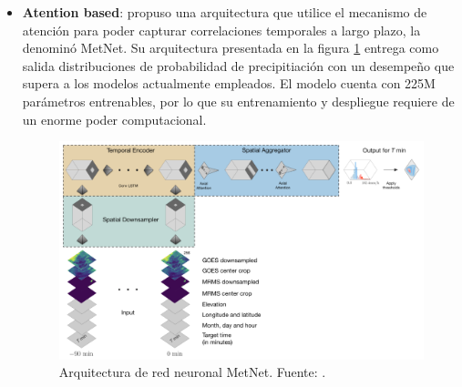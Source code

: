 \begin{itemize}
  \item \textbf{Atention based}: \cite{DBLP:journals/corr/abs-2003-12140} 
  propuso una arquitectura que utilice el mecanismo de atención para poder 
  capturar correlaciones temporales a largo plazo, la denominó MetNet. Su 
  arquitectura presentada en la figura \ref{fig:metnet} entrega como salida 
  distribuciones de probabilidad de precipitiación con un desempeño que supera 
  a los modelos actualmente empleados. El modelo cuenta con 225M parámetros 
  entrenables, por lo que su entrenamiento y despliegue requiere de un enorme 
  poder computacional.
  \begin{figure}[H]
    \centering
    \includegraphics[width=12cm]{E_IMAGENES/3_EstadoArte/metnet}
    \caption{
      Arquitectura de red neuronal MetNet. Fuente: 
      \cite{DBLP:journals/corr/abs-2003-12140}.
    }
    \label{fig:metnet}
  \end{figure}

\end{itemize}


